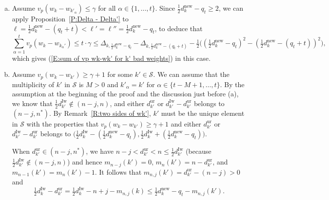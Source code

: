 \documentclass[12pt]{amsart}
\theoremstyle{definition}
\numberwithin{equation}{subsection}
\def\calS{\mathcal{S}}
\newcommand{\new}{\mathrm{new}}
\newcommand{\Iw}{\mathrm{Iw}}
\newcommand{\ur}{\mathrm{ur}}
\begin{document}
\begin{enumerate}[(a)]
\item Assume $v_p(w_k-w_{k'_\alpha})\leq \gamma$ for all $\alpha\in \{1,\dots, t \}$. Since $\tfrac 12 d_k^\new -q_t\geq 2$, we can  apply Proposition~\ref{P:Delta - Delta'} to $\ell=\frac 12 d_k^\new -(q_t+t)<\ell'=\ell''=\frac 12 d_k^\new-q_t$, to deduce that
				\[
				\sum_{\alpha=1}^t v_p(w_k-w_{k_\alpha'})\leq t\cdot\gamma\leq \Delta_{k,\frac 12 d_k^\new-q_t}-\Delta_{k,\frac 12 d_k^\new-(q_t+t)}-\tfrac 12\big((\tfrac 12d_k^\new-q_t)^2-(\tfrac 12d_k^\new- (q_t+t))^2 \big),
				\]
				which gives (\ref{E:sum of vp wk-wk' for k' bad weights}) in this case.
\item Assume $v_p(w_k-w_{k'})\geq \gamma+1$ for some $k'\in \calS$. We can assume that the multiplicity of $k'$ in $\calS$ is $M>0$ and $k'_\alpha=k'$ for $\alpha\in \{t-M+1,\dots, t \}$. By the assumption at the beginning of the proof and the discussion just before (a), we know that $\frac 12 d_{k'}^\Iw\notin (n-j,n)$, and either $d_{k'}^\ur$ or $d_{k'}^\Iw-d_{k'}^\ur$ belongs to $(n-j,n^*)$. By Remark~\ref{R:two sides of wk'}, $k'$ must be the unique element in $\calS$ with the properties that $v_p(w_k-w_{k'})\geq \gamma+1$ and either $d_{k'}^\ur$ or $d_{k'}^\Iw-d_{k'}^\ur$ belongs to $\big(\frac 12 d_k^\Iw-(\frac 12 d_k^\new -q_t),\frac 12 d_k^\Iw+(\frac 12 d_k^\new -q_t)\big)$.
				
When $d_{k'}^\ur\in (n-j,n^\ast)$, we have $n-j<d_{k'}^\ur<n\leq \frac 12 d_{k'}^\Iw$ (because $\frac 12d_{k'}^\Iw \not\in (n-j,n)$) and hence $m_{n-j}(k')=0$, $m_n(k')=n-d_{k'}^\ur$, and $m_{n-1}(k')=m_n(k')-1$. It follows that $m_{n,j}(k')=d_{k'}^\ur-(n-j)>0$ and
				\begin{equation}
				\label{E: 1/2dkIw-dk'ur}
				\tfrac 12 d_k^\Iw-d_{k'}^\ur=\tfrac 12 d_k^\Iw-n+j-m_{n,j}(k)\leq \tfrac 12 d_k^\new -q_t-m_{n,j}(k').
				\end{equation}
				

\end{enumerate}
\end{document}
